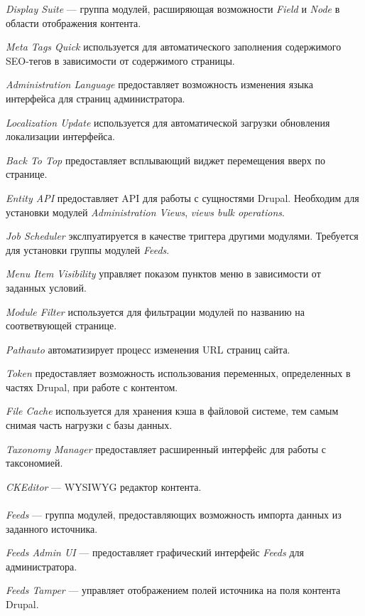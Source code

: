\textit{Display Suite} --- группа модулей, расширяющая возможности
\textit{Field} и \textit{Node} в области отображения контента.

\textit{Meta Tags Quick} используется для автоматического заполнения содержимого
SEO-тегов в зависимости от содержимого страницы.

\textit{Administration Language} предоставляет возможность изменения языка интерфейса для
страниц администратора.

\textit{Localization Update} используется для автоматической загрузки обновления
локализации интерфейса.

\textit{Back To Top} предоставляет всплывающий виджет перемещения вверх по странице.

\textit{Entity API} предоставляет API для работы с сущностями Drupal.
Необходим для установки модулей \textit{Administration Views},
\textit{views bulk operations}.

\textit{Job Scheduler} экслпуатируется в качестве триггера другими модулями.
Требуется для установки группы модулей \textit{Feeds}.

\textit{Menu Item Visibility} управляет показом пунктов меню в зависимости от заданных условий.

\textit{Module Filter} используется для фильтрации модулей по названию на соответвующей странице.

\textit{Pathauto} автоматизирует процесс изменения URL страниц сайта.

\textit{Token} предоставляет возможность использования переменных,
определенных в частях Drupal, при работе с контентом.

\textit{File Cache} используется для хранения кэша в файловой системе,
тем самым снимая часть нагрузки с базы данных.

\textit{Taxonomy Manager} предоставляет расширенный интерфейс для работы с таксономией.

\textit{CKEditor} --- WYSIWYG редактор контента.

\paragraph{}
\textit{Feeds} --- группа модулей, предоставляющих возможность импорта данных 
из заданного источника.

\textit{Feeds Admin UI} --- предоставляет графический интерфейс \textit{Feeds} для администратора.

\textit{Feeds Tamper} --- управляет отображением полей источника на поля контента Drupal. 


